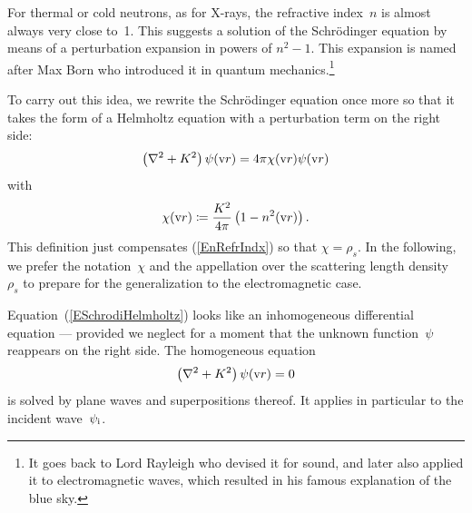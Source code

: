 For thermal or cold neutrons,
as for X-rays, the refractive index~$n$ is almost always
very close to~1.
This suggests a solution of the Schrödinger equation
by means of a perturbation expansion in powers of $n^2-1$.
This expansion is named after Max Born
who introduced it in quantum mechanics.\footnote
{It goes back to Lord Rayleigh
who devised it for sound,
and later also applied it to electromagnetic waves,
which resulted in his famous explanation of the blue sky.}

To carry out this idea, we rewrite the Schrödinger equation
once more so that it takes the form of a Helmholtz equation
%
with a perturbation term on the right side:
\begin{equation}\label{ESchrodiHelmholtz}
  \left(\mathbf{\nabla}^2+K^2\right)\psi(\text{v}{r})
  = 4\pi\chi(\text{v}{r})\psi(\text{v}{r})
\end{equation}
with
\begin{equation}\label{EChiDef}
  \chi(\text{v}{r}) \coloneqq  \frac{K^2}{4\pi}\left(1-n^2(\text{v}{r})\right).
\end{equation}
%
This definition just compensates (\ref{EnRefrIndx}) so that $\chi=\rho_s$.
In the following, we prefer the notation~$\chi$
and the appellation 
%
%
over the scattering length density~$\rho_s$
to prepare for the generalization to the electromagnetic case.

Equation~(\ref{ESchrodiHelmholtz}) looks
like an inhomogeneous differential equation ---
provided we neglect for a moment that the unknown function~$\psi$
reappears on the right side.
The homogeneous equation
\begin{equation}\label{EHelmholtzHomog}
  \left(\mathbf{\nabla}^2+K^2\right)\psi(\text{v}{r}) = 0
\end{equation}
is solved by plane waves and superpositions thereof.
It applies in particular to the incident wave~$\psi_{\text{i}}$.

